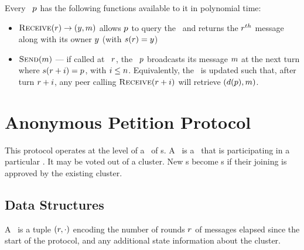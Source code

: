 Every \KwPeer~$\peer$ has the following functions available to it in
polynomial time:
\begin{itemize}
  \item $\SigRecv \to (\nym, \msg)$ allows $\peer$ to query
    the \HistoryOracle~and returns the $\turn^{th}$ message along with its owner
    $\nym$ (with $\FunSched(\turn) = \nym $)
  \item $\SigSend$ --- if called at \KwTurn~$\turn$, the \KwPeer~$\peer$
    broadcasts its message $\msg$ at the next turn where
    $\FunSched(\turn+i) = p$, with $i \le \NumClients$. Equivalently, the
    \HistoryOracle~is updated such that, after turn $\turn+i$, any peer calling
    $\SigRecv[\turn+i]$ will retrieve $(\FunNym(\peer), \msg)$.
\end{itemize}

%
%
\section{Anonymous Petition Protocol}
  This protocol operates at the level of a \KwCluster~of
    \KwPeer s.
    A \KwMember~is a \KwPeer~that is participating in a
    particular \KwCluster. It may be voted out of a cluster. New \KwPeer s
    become \KwMember s if their joining is approved by the existing cluster.

\subsection{Data Structures}
  A \StructState~is a tuple $\State$ encoding the number of rounds
  $\round$ of messages elapsed since the start of the protocol, and any
  additional state information about the cluster.
%

